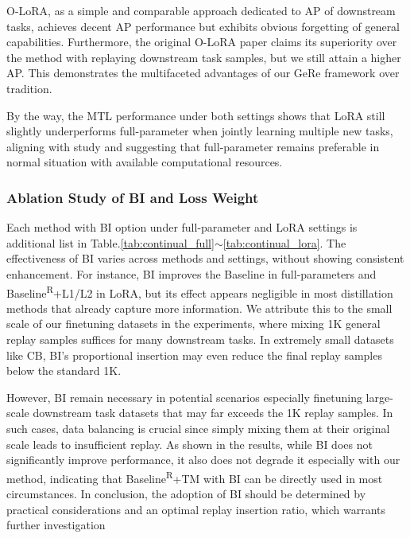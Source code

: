 O-LoRA, as a simple and comparable approach dedicated to AP of downstream tasks, achieves decent AP performance but exhibits obvious forgetting of general capabilities. Furthermore, the original O-LoRA paper claims its superiority over the method with replaying downstream task samples, but we still attain a higher AP. This demonstrates the multifaceted advantages of our GeRe framework over tradition.

By the way, the MTL performance under both settings shows that LoRA still slightly underperforms full-parameter when jointly learning multiple new tasks, aligning with study\cite{biderman2024lora} and suggesting that full-parameter remains preferable in normal situation with available computational resources.

\subsubsection{Ablation Study of BI and Loss Weight}
Each method with BI option under full-parameter and LoRA settings is additional list in Table.\ref{tab:continual_full}$\sim$\ref{tab:continual_lora}.
The effectiveness of BI varies across methods and settings, without showing consistent enhancement. For instance, BI improves the Baseline in full-parameters and Baseline\textsuperscript{R}+L1/L2 in LoRA, but its effect appears negligible in most distillation methods that already capture more information.
We attribute this to the small scale of our finetuning datasets in the experiments, where mixing 1K general replay samples suffices for many downstream tasks. In extremely small datasets like CB, BI’s proportional insertion may even reduce the final replay samples below the standard 1K.

However, BI remain necessary in potential scenarios especially finetuning large-scale downstream task datasets that may far exceeds the 1K replay samples. In such cases, data balancing is crucial since simply mixing them at their original scale leads to insufficient replay. 
As shown in the results, while BI does not significantly improve performance, it also does not degrade it especially with our method, indicating that Baseline\textsuperscript{R}+TM with BI can be directly used in most circumstances.
In conclusion, the adoption of BI should be determined by practical considerations and an optimal replay insertion ratio, which warrants further investigation

